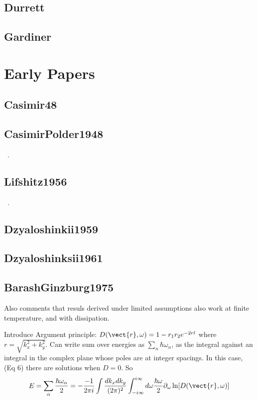 \subsection{Durrett}

\subsection{Gardiner}



\section{Early Papers}

\subsection{Casimir48}


\cite{Casimir1948}

\subsection{CasimirPolder1948}


~\cite{CasimirPolder1948}.  

\subsection{Lifshitz1956}

~\cite{Lifshitz1956}.  

\subsection{Dzyaloshinkii1959}

\cite{Dzyaloshinskii1959}
\subsection{Dzyaloshinksii1961}

\cite{Dzyaloshinskii1961}

\subsection{BarashGinzburg1975}

\cite{Barash1975}
Also comments that resuls derived under limited assumptions also work at finite temperature,
 and with dissipation.  

Introduce Argument principle: $D(\vect{r},\omega)= 1-r_1r_2 e^{-2 r l}$ where $r=\sqrt{k_x^2+k_y^2}$.  
Can write sum over energies as $\sum_n \hbar\omega_n$,
 as the integral against an integral in the complex plane whose poles are at integer spacings.  
In this case, (Eq 6) there are solutions when $D=0$.  So 
\begin{equation}
E=\sum_{\alpha}\frac{\hbar\omega_\alpha}{2}=
-\frac{-1}{2\pi i} \int \frac{dk_xdk_y}{(2\pi)^2}\int_{-i\infty}^{i\infty}d\omega
 \frac{\hbar\omega}{2}\partial_\omega\ln[D(\vect{r},\omega)]
\end{equation}

